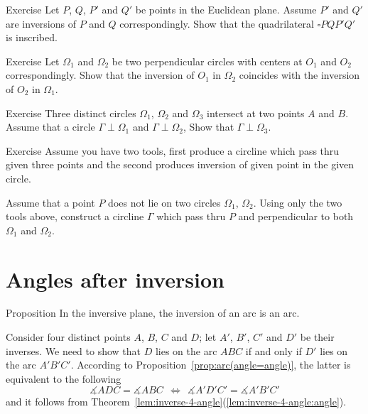 \begin{thm}{Exercise}\label{ex:inscribed+inv}
Let $P$, $Q$, $P'$ and $Q'$ be points in the Euclidean plane.
Assume $P'$ and $Q'$ are inversions 
of $P$ and $Q$ correspondingly.
Show that the quadrilateral $\square PQP'Q'$ is inscribed.
\end{thm}

\begin{thm}{Exercise}\label{ex:centers-of-perp-circles}
Let $\Omega_1$ and $\Omega_2$ be two perpendicular circles with centers at $O_1$ and $O_2$ correspondingly.
Show that the inversion of $O_1$ in $\Omega_2$ 
coincides with 
the inversion of $O_2$ in $\Omega_1$.
\end{thm}

\begin{thm}{Exercise}\label{ex:4-th-perp-circ}
Three distinct circles $\Omega_1$, $\Omega_2$ and $\Omega_3$ intersect at two points $A$ and $B$.
Assume that a circle $\Gamma\perp\Omega_1$ and $\Gamma\perp\Omega_2$,
Show that $\Gamma\perp\Omega_3$.
\end{thm}

\begin{thm}{Exercise}\label{ex:construction-perp-clines}
Assume you have two tools,
first produce a circline which pass thru given three points 
and the second produces inversion of given point in the given circle.

Assume that a point $P$ does not lie on two circles $\Omega_1$, $\Omega_2$.
Using only the two tools above,
construct a circline $\Gamma$ which pass thru $P$ 
and perpendicular to both $\Omega_1$ and $\Omega_2$.
\end{thm}

\section*{Angles after inversion}

\begin{thm}{Proposition}
In the inversive plane,
the inversion of an arc is an arc.
\end{thm}

Consider four distinct points $A$, $B$, $C$ and $D$; 
let $A'$, $B'$, $C'$ and $D'$  be their inverses.
We need to show that $D$ lies on the arc $ABC$ if and only if $D'$ lies on the arc $A'B'C'$.
According to Proposition~\ref{prop:arc(angle=angle)},
the latter is equivalent to the following
$$\measuredangle ADC= \measuredangle ABC
\ \  \iff\ \ 
\measuredangle A'D'C'= \measuredangle A'B'C'$$
and it follows from Theorem~\ref{lem:inverse-4-angle}(\ref{lem:inverse-4-angle:angle}).
\qeds

